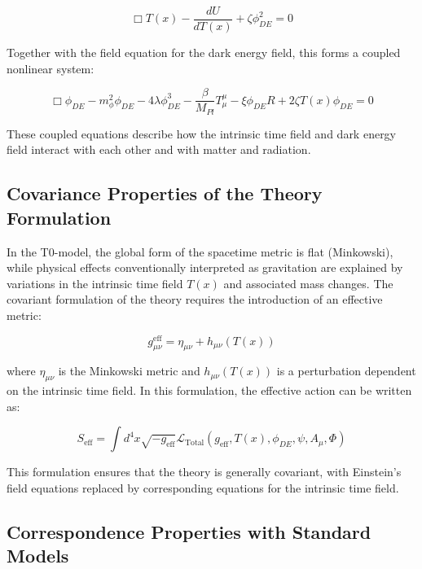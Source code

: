 \documentclass[a4paper,12pt]{article}
\theoremstyle{definition}
\theoremstyle{remark}
\newcommand{\Tfield}{T(x)} %
\begin{document}
	\begin{equation}
		\Box \Tfield - \frac{dU}{d\Tfield} + \zeta \phi_{DE}^2 = 0
	\end{equation}
	
	Together with the field equation for the dark energy field, this forms a coupled nonlinear system:
	
	\begin{equation}
		\Box\phi_{DE} - m_{\phi}^2\phi_{DE} - 4\lambda\phi_{DE}^3 - \frac{\beta}{M_{Pl}}T^{\mu}_{\mu} - \xi \phi_{DE} R + 2\zeta \Tfield \phi_{DE} = 0
	\end{equation}
	
	These coupled equations describe how the intrinsic time field and dark energy field interact with each other and with matter and radiation.
	
	\subsection{Covariance Properties of the Theory Formulation}
	
	In the T0-model, the global form of the spacetime metric is flat (Minkowski), while physical effects conventionally interpreted as gravitation are explained by variations in the intrinsic time field \(\Tfield\) and associated mass changes. The covariant formulation of the theory requires the introduction of an effective metric:
	
	\begin{equation}
		g_{\mu\nu}^{\text{eff}} = \eta_{\mu\nu} + h_{\mu\nu}(\Tfield)
	\end{equation}
	
	where \(\eta_{\mu\nu}\) is the Minkowski metric and \(h_{\mu\nu}(\Tfield)\) is a perturbation dependent on the intrinsic time field. In this formulation, the effective action can be written as:
	
	\begin{equation}
		S_{\text{eff}} = \int d^4x \sqrt{-g_{\text{eff}}} \mathcal{L}_{\text{Total}}(g_{\text{eff}}, \Tfield, \phi_{DE}, \psi, A_\mu, \Phi)
	\end{equation}
	
	This formulation ensures that the theory is generally covariant, with Einstein's field equations replaced by corresponding equations for the intrinsic time field.
	
	\subsection{Correspondence Properties with Standard Models}
	
\end{document}
